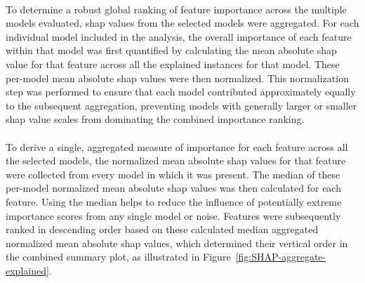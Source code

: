 \documentclass[12pt,a4paper]{report}
\begin{document}
\\
\noindent
To determine a robust global ranking of feature importance across the multiple models evaluated, \gls{shap} values from the selected models were aggregated. For each individual model included in the analysis, the overall importance of each feature within that model was first quantified by calculating the mean absolute \gls{shap} value for that feature across all the explained instances for that model. These per-model mean absolute \gls{shap} values were then normalized. This normalization step was performed to ensure that each model contributed approximately equally to the subsequent aggregation, preventing models with generally larger or smaller \gls{shap} value scales from dominating the combined importance ranking.\\
\\
To derive a single, aggregated measure of importance for each feature across all the selected models, the normalized mean absolute \gls{shap} values for that feature were collected from every model in which it was present. The median of these per-model normalized mean absolute \gls{shap} values was then calculated for each feature. Using the median helps to reduce the influence of potentially extreme importance scores from any single model or noise. Features were subsequently ranked in descending order based on these calculated median aggregated normalized mean absolute \gls{shap} values, which determined their vertical order in the combined summary plot, as illustrated in Figure~\ref{fig:SHAP-aggregate-explained}.

\pagebreak
\end{document}
